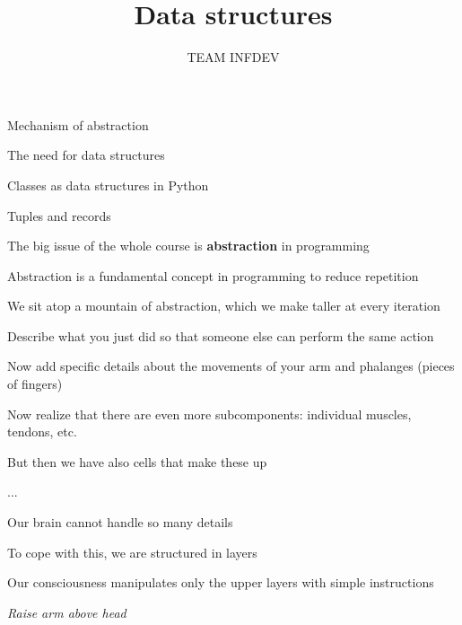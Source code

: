 \documentclass{beamer}
\title{Data structures}
\author{TEAM INFDEV}
\institute{Hogeschool Rotterdam \\ 
Rotterdam, Netherlands}
\date{}
\begin{document}
\maketitle

\begin{slide}{
\item Mechanism of abstraction
\item The need for data structures
\item Classes as data structures in Python
\item Tuples and records
}\end{slide}

\begin{slide}{
\item The big issue of the whole course is \textbf{abstraction} in programming
\item Abstraction is a fundamental concept in programming to reduce repetition
\item We sit atop a mountain of abstraction, which we make taller at every iteration
}\end{slide}

\begin{slide}{
\item Describe what you just did so that someone else can perform the same action
\pause
\item Now add specific details about the movements of your arm and phalanges (pieces of fingers)
\pause
\item Now realize that there are even more subcomponents: individual muscles, tendons, etc.
\pause
\item But then we have also cells that make these up
\item ...
}\end{slide}

\begin{slide}{
\item Our brain cannot handle so many details
\item To cope with this, we are structured in layers
\item Our consciousness manipulates only the upper layers with simple instructions
\item \textit{Raise arm above head}
}\end{slide}
\end{document}
